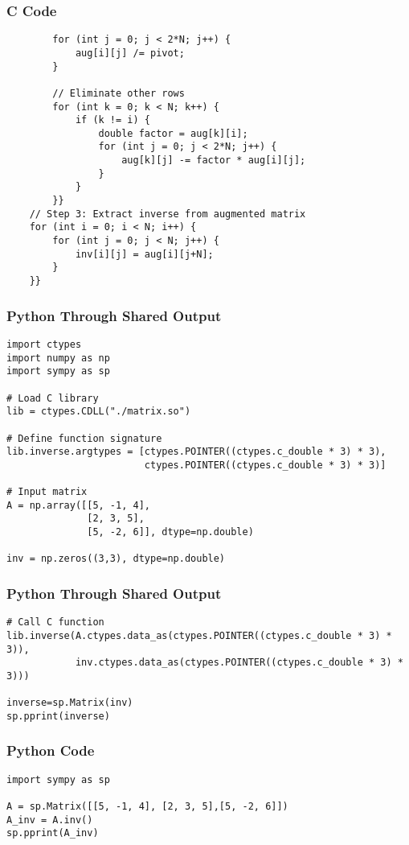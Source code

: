 \documentclass{beamer}
\begin{document}
\begin{frame}[fragile]
\frametitle{C Code}
\begin{lstlisting}
        for (int j = 0; j < 2*N; j++) {
            aug[i][j] /= pivot;
        }

        // Eliminate other rows
        for (int k = 0; k < N; k++) {
            if (k != i) {
                double factor = aug[k][i];
                for (int j = 0; j < 2*N; j++) {
                    aug[k][j] -= factor * aug[i][j];
                }
            }
        }}
    // Step 3: Extract inverse from augmented matrix
    for (int i = 0; i < N; i++) {
        for (int j = 0; j < N; j++) {
            inv[i][j] = aug[i][j+N];
        }
    }}
 \end{lstlisting}
\end{frame}
\begin{frame}[fragile]
\frametitle{Python Through Shared Output}
\begin{lstlisting} 
import ctypes
import numpy as np
import sympy as sp

# Load C library
lib = ctypes.CDLL("./matrix.so")

# Define function signature
lib.inverse.argtypes = [ctypes.POINTER((ctypes.c_double * 3) * 3),
                        ctypes.POINTER((ctypes.c_double * 3) * 3)]

# Input matrix
A = np.array([[5, -1, 4],
              [2, 3, 5],
              [5, -2, 6]], dtype=np.double)

inv = np.zeros((3,3), dtype=np.double)
 \end{lstlisting}
\end{frame}
\begin{frame}[fragile]
\frametitle{Python Through Shared Output}
\begin{lstlisting} 
# Call C function
lib.inverse(A.ctypes.data_as(ctypes.POINTER((ctypes.c_double * 3) * 3)),
            inv.ctypes.data_as(ctypes.POINTER((ctypes.c_double * 3) * 3)))

inverse=sp.Matrix(inv)
sp.pprint(inverse)
 \end{lstlisting}
\end{frame}
\begin{frame}[fragile]
\frametitle{Python Code}
\begin{lstlisting} 
import sympy as sp

A = sp.Matrix([[5, -1, 4], [2, 3, 5],[5, -2, 6]])
A_inv = A.inv()
sp.pprint(A_inv) 
\end{lstlisting}
\end{frame}
\end{document}
